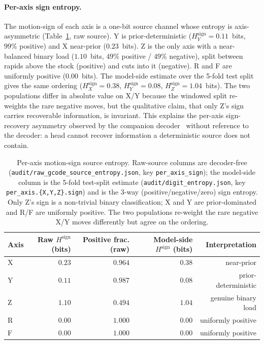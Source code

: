 \documentclass[entropy,article,submit,moreauthors,pdftex]{Definitions/mdpi}
\begin{document}
\paragraph{Per-axis sign entropy.} The motion-sign of each axis is a one-bit source channel whose entropy is axis-asymmetric (Table~\ref{tab:sign_entropy}, raw source). Y is prior-deterministic ($H_Y^{\text{sign}}=0.11$~bits, $99\%$ positive) and X near-prior ($0.23$~bits). Z is the only axis with a near-balanced binary load ($1.10$~bits, $49\%$ positive / $49\%$ negative), split between rapids above the stock (positive) and cuts into it (negative). R and F are uniformly positive ($0.00$~bits). The model-side estimate over the 5-fold test split gives the same ordering ($H_X^{\text{sign}}=0.38$, $H_Y^{\text{sign}}=0.08$, $H_Z^{\text{sign}}=1.04$~bits). The two populations differ in absolute value on X/Y because the windowed split re-weights the rare negative moves, but the qualitative claim, that only Z's sign carries recoverable information, is invariant. This explains the per-axis sign-recovery asymmetry observed by the companion decoder~\cite{paperA_decoder} without reference to the decoder: a head cannot recover information a deterministic source does not contain.

\begin{table}[ht]
\centering
\caption{Per-axis motion-sign source entropy. Raw-source columns are decoder-free (\texttt{audit/raw\_gcode\_source\_entropy.json}, key \texttt{per\_axis\_sign}); the model-side column is the 5-fold test-split estimate (\texttt{audit/digit\_entropy.json}, key \texttt{per\_axis.\{X,Y,Z\}.sign}) and is the 3-way (positive/negative/zero) sign entropy. Only Z's sign is a non-trivial binary classification; X and Y are prior-dominated and R/F are uniformly positive. The two populations re-weight the rare negative X/Y moves differently but agree on the ordering.}
\label{tab:sign_entropy}
\begin{tabular}{l r r r r}
\toprule
Axis & Raw $H^{\text{sign}}$ (bits) & Positive frac. (raw) & Model-side $H^{\text{sign}}$ (bits) & Interpretation \\
\midrule
X & $0.23$ & $0.964$ & $0.38$ & near-prior \\
Y & $0.11$ & $0.987$ & $0.08$ & prior-deterministic \\
Z & $1.10$ & $0.494$ & $1.04$ & genuine binary load \\
R & $0.00$ & $1.000$ & $0.00$ & uniformly positive \\
F & $0.00$ & $1.000$ & $0.00$ & uniformly positive \\
\bottomrule
\end{tabular}
\end{table}
\end{document}
